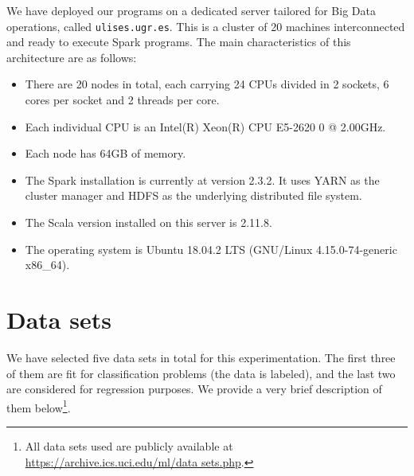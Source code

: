 We have deployed our programs on a dedicated server tailored for Big Data operations, called \verb|ulises.ugr.es|. This is a cluster of 20 machines interconnected and ready to execute Spark programs. The main characteristics of this architecture are as follows:

\begin{itemize}
  \item There are 20 nodes in total, each carrying 24 CPUs divided in 2 sockets, 6 cores per socket and 2 threads per core.
  \item Each individual CPU is an Intel(R) Xeon(R) CPU E5-2620 0 @ 2.00GHz.
  \item Each node has 64GB of memory.
  \item The Spark installation is currently at version 2.3.2. It uses YARN as the cluster manager and HDFS as the underlying distributed file system.
  \item The Scala version installed on this server is 2.11.8.
  \item The operating system is Ubuntu 18.04.2 LTS (GNU/Linux 4.15.0-74-generic x86\_64).
\end{itemize}

\section{Data sets}

We have selected five data sets in total for this experimentation. The first three of them are fit for classification problems (the data is labeled), and the last two are considered for regression purposes. We provide a very brief description of them below\footnote{All data sets used are publicly available at \url{https://archive.ics.uci.edu/ml/data sets.php}.}.

